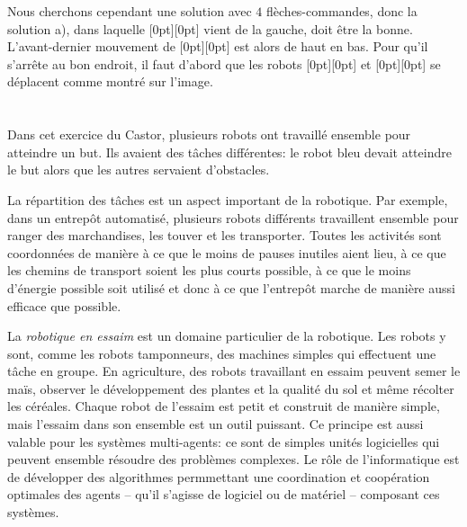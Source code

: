 {{Nous cherchons cependant une solution avec $4$ flèches-commandes, donc la solution a), dans laquelle \raisebox{-0.5ex}[0pt][0pt]{} vient de la gauche, doit être la bonne. L’avant-dernier mouvement de \raisebox{-0.5ex}[0pt][0pt]{} est alors de haut en bas. Pour qu’il s’arrête au bon endroit, il faut d’abord que les robots \raisebox{-0.5ex}[0pt][0pt]{} et \raisebox{-0.5ex}[0pt][0pt]{} se déplacent comme montré sur l’image.



\section*{\BrochureItsInformatics}
Dans cet exercice du Castor, plusieurs robots ont travaillé ensemble pour atteindre un but. Ils avaient des tâches différentes: le robot bleu devait atteindre le but alors que les autres servaient d’obstacles.

La répartition des tâches est un aspect important de la robotique. Par exemple, dans un entrepôt automatisé, plusieurs robots différents travaillent ensemble pour ranger des marchandises, les touver et les transporter. Toutes les activités sont coordonnées de manière à ce que le moins de pauses inutiles aient lieu, à ce que les chemins de transport soient les plus courts possible, à ce que le moins d’énergie possible soit utilisé et donc à ce que l’entrepôt marche de manière aussi efficace que possible.

La \emph{robotique en essaim} est un domaine particulier de la robotique. Les robots y sont, comme les robots tamponneurs, des machines simples qui effectuent une tâche en groupe. En agriculture, des robots travaillant en essaim peuvent semer le maïs, observer le développement des plantes et la qualité du sol et même récolter les céréales. Chaque robot de l’essaim est petit et construit de manière simple, mais l’essaim dans son ensemble est un outil puissant. Ce principe est aussi valable pour les systèmes multi-agents: ce sont de simples unités logicielles qui peuvent ensemble résoudre des problèmes complexes. Le rôle de l’informatique est de développer des algorithmes permmettant une coordination et coopération optimales des agents – qu’il s’agisse de logiciel ou de matériel – composant ces systèmes.



}}
